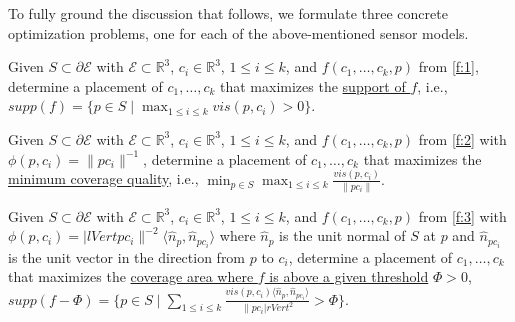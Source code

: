 To fully ground the discussion that follows, we formulate three concrete optimization problems, one for each of the above-mentioned sensor models. 

\begin{problem}\label{p:1} 
    Given $S \subset \partial \mathcal E$ with $\mathcal E \subset \mathbb R^{3}$, $c_i \in \mathbb R^3$, 
    $1 \le i \le k$, and $f(c_1, \ldots, c_k, p)$ from \eqref{f:1}, 
    determine a placement of $c_1, \ldots, c_k$ that maximizes the \ul{support of $f$}, i.e., 
    $supp(f) = \{p \in S \mid \max_{1\le i \le k}vis(p, c_i) >0\}.$  
\end{problem}

\begin{problem}\label{p:2} 
    Given $S \subset \partial \mathcal E$ with $\mathcal E \subset \mathbb R^{3}$, $c_i \in \mathbb R^3$, 
    $1 \le i \le k$, and $f(c_1, \ldots, c_k, p)$ from \eqref{f:2} with $\phi(p, c_i) = \lVert pc_i\rVert^{-1}$, 
    determine a placement of $c_1, \ldots, c_k$ that maximizes the \ul{minimum coverage quality}, i.e., 
    $\min_{p \in S} \max_{1\le i \le k} \frac{vis(p, c_i)}{ \lVert pc_i\rVert}.$
\end{problem}

\begin{problem}\label{p:3} 
    Given $S \subset \partial \mathcal E$ with $\mathcal E \subset \mathbb R^{3}$, 
    $c_i \in \mathbb R^3$, $1 \le i \le k$, and $f(c_1, \ldots, c_k, p)$ from \eqref{f:3} with $\phi(p, c_i) = |lVert pc_i\rVert^{-2}\langle \hat{n}_p, \hat{n}_{pc_i} \rangle$ where $\hat{n}_p$ is the unit normal of $S$ at $p$ and $\hat{n}_{pc_i}$ is the unit vector in the direction from $p$ to $c_i$, 
    determine a placement of $c_1, \ldots, c_k$ that maximizes the \ul{coverage area where $f$ is above a given threshold} $\Phi > 0$,
    $supp(f - \Phi) = \{p \in S \mid \sum_{1\le i \le k} \frac{vis(p, c_i)\langle \hat{n}_p, \hat{n}_{pc_i} \rangle}{ \lVert pc_i|rVert ^2} > \Phi \}.$  
\end{problem}


